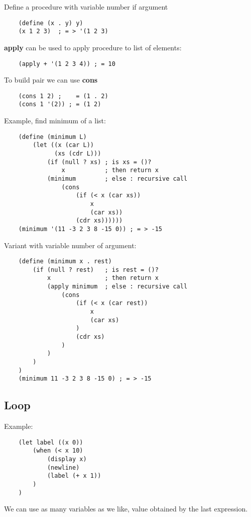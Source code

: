 Define a procedure with variable number if argument
\begin{lstlisting}
    (define (x . y) y)
    (x 1 2 3)  ; = > '(1 2 3)
\end{lstlisting}
\textbf{apply} can be used to apply procedure to list of elements:
\begin{lstlisting}
    (apply + '(1 2 3 4)) ; = 10
\end{lstlisting}
To build pair we can use \textbf{cons}
\begin{lstlisting}
    (cons 1 2) ;    = (1 . 2)
    (cons 1 '(2)) ; = (1 2)
\end{lstlisting}
Example, find minimum of a list:
\begin{lstlisting}
    (define (minimum L)
        (let ((x (car L))
              (xs (cdr L)))
            (if (null ? xs) ; is xs = ()?
                x           ; then return x
            (minimum        ; else : recursive call
                (cons
                    (if (< x (car xs))
                        x
                        (car xs))
                    (cdr xs))))))
    (minimum '(11 -3 2 3 8 -15 0)) ; = > -15
\end{lstlisting}
Variant with variable number of argument:
\begin{lstlisting}
    (define (minimum x . rest)
        (if (null ? rest)   ; is rest = ()?
            x               ; then return x
            (apply minimum  ; else : recursive call
                (cons
                    (if (< x (car rest))
                        x
                        (car xs)
                    )
                    (cdr xs)
                )
            )
        )
    )
    (minimum 11 -3 2 3 8 -15 0) ; = > -15
\end{lstlisting}

\subsection{Loop}
Example:
\begin{lstlisting}
    (let label ((x 0))
        (when (< x 10)
            (display x)
            (newline)
            (label (+ x 1))
        )
    )
\end{lstlisting}
We can use as many variables as we like, value obtained by the last expression.

